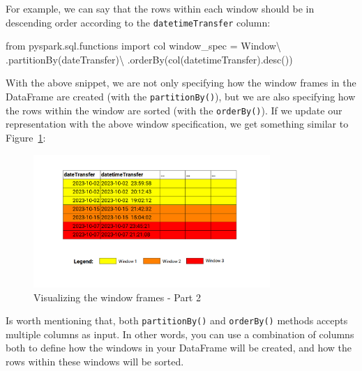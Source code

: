 \documentclass[
  11pt,
  letterpaper,
  DIV=11,
  numbers=noendperiod]{scrreprt}
\newenvironment{Shaded}{\begin{snugshade}}{\end{snugshade}}
\newcommand{\ImportTok}[1]{\textcolor[rgb]{0.00,0.46,0.62}{#1}}
\newcommand{\NormalTok}[1]{\textcolor[rgb]{0.00,0.23,0.31}{#1}}
\newcommand{\OperatorTok}[1]{\textcolor[rgb]{0.37,0.37,0.37}{#1}}
\newcommand{\StringTok}[1]{\textcolor[rgb]{0.13,0.47,0.30}{#1}}
\begin{document}
For example, we can say that the rows within each window should be in
descending order according to the \texttt{datetimeTransfer} column:

\begin{Shaded}
\begin{Highlighting}[]
\ImportTok{from}\NormalTok{ pyspark.sql.functions }\ImportTok{import}\NormalTok{ col}
\NormalTok{window\_spec }\OperatorTok{=}\NormalTok{ Window}\OperatorTok{\textbackslash{}}
\NormalTok{    .partitionBy(}\StringTok{\textquotesingle{}dateTransfer\textquotesingle{}}\NormalTok{)}\OperatorTok{\textbackslash{}}
\NormalTok{    .orderBy(col(}\StringTok{\textquotesingle{}datetimeTransfer\textquotesingle{}}\NormalTok{).desc())}
\end{Highlighting}
\end{Shaded}

With the above snippet, we are not only specifying how the window frames
in the DataFrame are created (with the \texttt{partitionBy()}), but we
are also specifying how the rows within the window are sorted (with the
\texttt{orderBy()}). If we update our representation with the above
window specification, we get something similar to
Figure~\ref{fig-window-spec2}:

\begin{figure}

{\centering \includegraphics[width=0.8\textwidth,height=\textheight]{Chapters/./../Figures/window-spec2.png}

}

\caption{\label{fig-window-spec2}Visualizing the window frames - Part 2}

\end{figure}

Is worth mentioning that, both \texttt{partitionBy()} and
\texttt{orderBy()} methods accepts multiple columns as input. In other
words, you can use a combination of columns both to define how the
windows in your DataFrame will be created, and how the rows within these
windows will be sorted.
\end{document}

